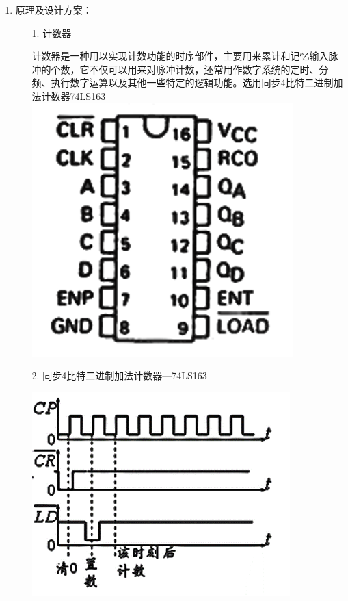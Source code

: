 \documentclass[UTF8]{ctexart}
\begin{document}
\begin{enumerate}
    \large
    \vspace{1\baselineskip}
    \item 原理及设计方案：  \\
          \begin{itemize}
              \item [1.] 计数器                  \\
                    \begin{center}
                        计数器是一种用以实现计数功能的时序部件，主要用来累计和记忆输入脉冲的个数，它不仅可以用来对脉冲计数，还常用作数字系统的定时、分频、执行数字运算以及其他一些特定的逻辑功能。选用同步4比特二进制加法计数器74LS163
                        \includegraphics[scale=0.6]{1.png}
                        \label{fig:label}
                    \end{center}

              \item [2.] 同步4比特二进制加法计数器—74LS163                  \\
                    \begin{center}
                        \includegraphics[scale = 0.6]{2.png}
                        \label{fig:label}
                    \end{center}


\end{itemize}
\end{enumerate}
\end{document}
